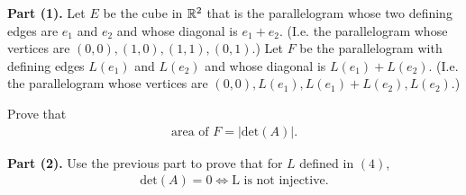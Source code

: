 \textbf{Part (1).} Let $E$ be the cube in $\mathbb R^2$ that is the parallelogram whose two defining edges are $e_1$ and $e_2$ and whose diagonal is $e_1+e_2$. (I.e. the parallelogram whose vertices are $(0,0),(1,0),(1,1),(0,1)$.) Let $F$ be the parallelogram with defining edges $L(e_1)$ and $L(e_2)$ and whose diagonal is $L(e_1)+L(e_2)$. (I.e. the parallelogram whose vertices are $(0,0),L(e_1),L(e_1)+L(e_2),L(e_2).$)

Prove that 
\[
    \begin{aligned}
        \text{area of }F=|\text{det}(A)|.
    \end{aligned}
\]

\textbf{Part (2).} Use the previous part to prove that for $L$ defined in $(4)$, 
\[
    \begin{aligned}
        \text{det}(A)=0\iff\text{L is not injective.}
    \end{aligned}
\]